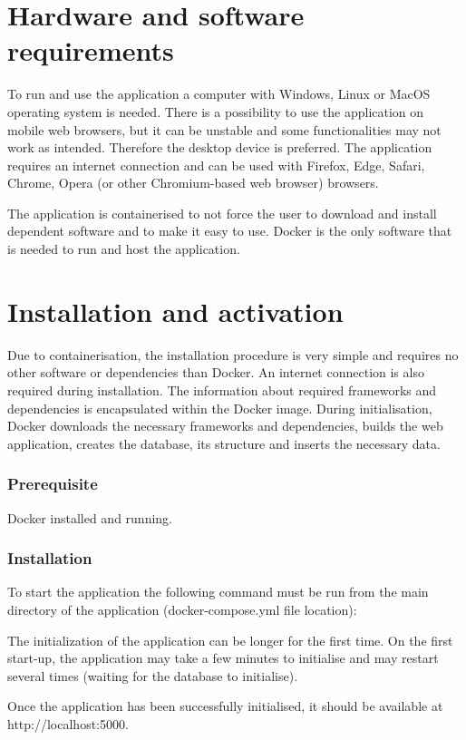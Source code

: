 \documentclass[a4paper,twoside,12pt]{book}
\begin{document}
\section{Hardware and software requirements}
To run and use the application a computer with Windows, Linux or MacOS operating system is needed. There is a possibility to use the application on mobile web browsers, but it can be unstable and some functionalities may not work as intended. Therefore the desktop device is preferred. The application requires an internet connection and can be used with Firefox, Edge, Safari, Chrome, Opera (or other Chromium-based web browser) browsers.

The application is containerised to not force the user to download and install dependent software and to make it easy to use. Docker is the only software that is needed to run and host the application.
\section{Installation and activation}
Due to containerisation, the installation procedure is very simple and requires no other software or dependencies than Docker. An internet connection is also required during installation. The information about required frameworks and dependencies is encapsulated within the Docker image. During initialisation, Docker downloads the necessary frameworks and dependencies, builds the web application, creates the database, its structure and inserts the necessary data.

\subsubsection{Prerequisite}
Docker installed and running.

\subsubsection{Installation}
To start the application the following command must be run from the main directory of the application (docker-compose.yml file location):


\noindent
{}


The initialization of the application can be longer for the first time.
On the first start-up, the application may take a few minutes to initialise and may restart several times (waiting for the database to initialise). 

Once the application has been successfully initialised, it should be available at http://localhost:5000.
\end{document}
